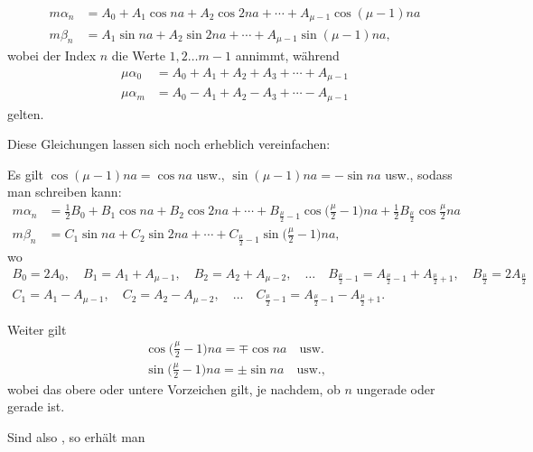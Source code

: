 \begin{landscape}
\[
\begin{aligned}
m\alpha_n &= A_0 + A_1\cos na + A_2\cos 2na + \cdots + A_{\mu-1}\cos(\mu-1)na\\
m\beta_n &= A_1\sin na + A_2\sin 2na + \cdots + A_{\mu-1}\sin(\mu-1)na,
\end{aligned}
\]
wobei der Index \(n\) die Werte \(1, 2 \ldots m-1\) annimmt, während
\[
\begin{aligned}
\mu\alpha_0 &= A_0 + A_1 + A_2 + A_3 + \cdots + A_{\mu-1}\\
\mu\alpha_m &= A_0 - A_1 + A_2 - A_3 + \cdots - A_{\mu-1}
\end{aligned}
\]
gelten.
\par\noindent\hspace*{\parindent}Diese Gleichungen lassen sich noch erheblich vereinfachen:
\par\noindent\hspace*{\parindent}Es gilt \(\cos(\mu-1)na = \cos na\) usw., \(\sin(\mu-1)na = -\sin na\) usw., sodass man schreiben kann:
\[
\begin{aligned}
m\alpha_n &= \tfrac12 B_0 + B_1\cos na + B_2\cos 2na + \cdots + B_{\frac{\mu}{2}-1}\cos\Big(\frac{\mu}{2}-1\Big)na + \tfrac12 B_{\frac{\mu}{2}}\cos\frac{\mu}{2}na\\
m\beta_n &= C_1\sin na + C_2\sin 2na + \cdots + C_{\frac{\mu}{2}-1}\sin\Big(\frac{\mu}{2}-1\Big)na,
\end{aligned}
\]
wo
\[
\begin{gathered}
B_0 = 2A_0,\quad B_1 = A_1+A_{\mu-1},\quad B_2 = A_2+A_{\mu-2},\quad \ldots\quad B_{\frac{\mu}{2}-1} = A_{\frac{\mu}{2}-1}+A_{\frac{\mu}{2}+1},\quad B_{\frac{\mu}{2}} = 2A_{\frac{\mu}{2}}\\[4pt]
C_1 = A_1-A_{\mu-1},\quad C_2 = A_2-A_{\mu-2},\quad \ldots\quad C_{\frac{\mu}{2}-1} = A_{\frac{\mu}{2}-1}-A_{\frac{\mu}{2}+1}.
\end{gathered}
\]
\par\noindent\hspace*{\parindent}Weiter gilt
\[
\begin{gathered}
\cos\Big(\frac{\mu}{2}-1\Big)na = \mp\cos na \quad \text{usw.}\\[4pt]
\sin\Big(\frac{\mu}{2}-1\Big)na = \pm\sin na \quad \text{usw.,}
\end{gathered}
\]
wobei das obere oder untere Vorzeichen gilt, je nachdem, ob \(n\) ungerade oder gerade ist.
\par\noindent\hspace*{\parindent}Sind also , so erhält man

\end{landscape}
